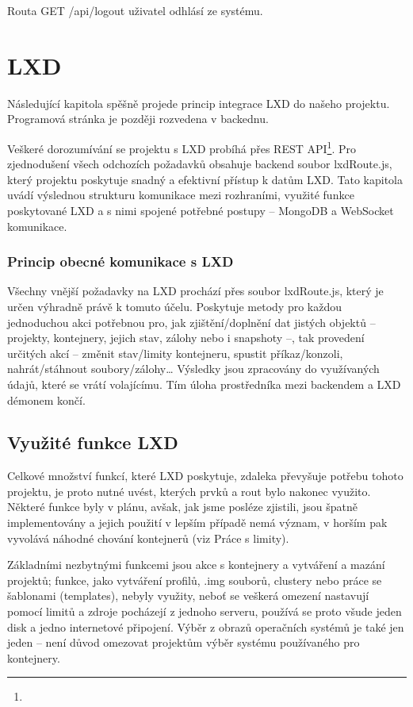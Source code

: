 \documentclass[a4paper,oneside,12pt]{report}
\begin{document}
Routa GET /api/logout uživatel odhlásí ze systému.

\section{LXD}

Následující kapitola spěšně projede princip integrace LXD do našeho projektu.
Programová stránka je později rozvedena v backednu.

Veškeré dorozumívání se projektu s LXD probíhá přes REST API\footnote{}.
Pro zjednodušení všech odchozích požadavků obsahuje backend soubor lxdRoute.js, který projektu poskytuje snadný a efektivní přístup k datům LXD.
Tato kapitola uvádí výslednou strukturu komunikace mezi rozhraními, využité funkce poskytované LXD a s nimi spojené potřebné postupy – MongoDB a WebSocket komunikace.

\subsubsection{Princip obecné komunikace s LXD}

Všechny vnější požadavky na LXD prochází přes soubor lxdRoute.js, který je určen výhradně právě k tomuto účelu.
Poskytuje metody pro každou jednoduchou akci potřebnou pro, jak zjištění/doplnění dat jistých objektů – projekty, kontejnery, jejich stav, zálohy nebo i snapshoty --, tak provedení určitých akcí -- změnit stav/limity kontejneru, spustit příkaz/konzoli, nahrát/stáhnout soubory/zálohy… Výsledky jsou zpracovány do využívaných údajů, které se vrátí volajícímu.
Tím úloha prostředníka mezi backendem a LXD démonem končí.

\subsection{Využité funkce LXD}

Celkové množství funkcí, které LXD poskytuje, zdaleka převyšuje potřebu tohoto projektu, je proto nutné uvést, kterých prvků a rout bylo nakonec využito.
Některé funkce byly v plánu, avšak, jak jsme posléze zjistili, jsou špatně implementovány a jejich použití v lepším případě nemá význam, v horším pak vyvolává náhodné chování kontejnerů (viz Práce s limity).

Základními nezbytnými funkcemi jsou akce s kontejnery a vytváření a mazání projektů; funkce, jako vytváření profilů, .img souborů, clustery nebo práce se šablonami (templates), nebyly využity, neboť se veškerá omezení nastavují pomocí limitů a zdroje pocházejí z jednoho serveru, používá se proto všude jeden disk a jedno internetové připojení.
Výběr z obrazů operačních systémů je také jen jeden – není důvod omezovat projektům výběr systému používaného pro kontejnery.
\end{document}
